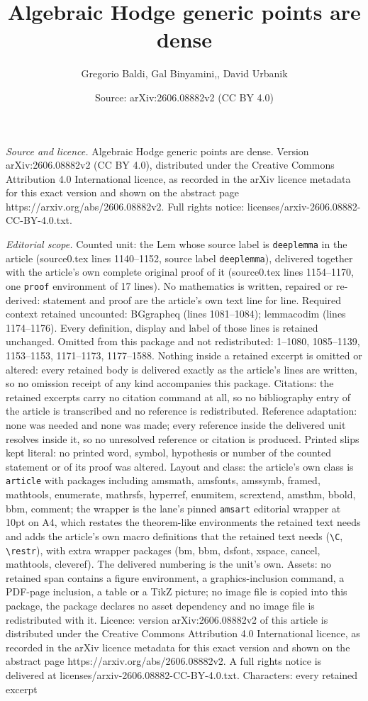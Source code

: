 \documentclass[10pt,a4paper]{amsart}
\title[Algebraic Hodge generic points are dense]{Algebraic Hodge generic points are dense}
\author{Gregorio Baldi, Gal Binyamini,, David Urbanik}
\date{Source: arXiv:2606.08882v2 (CC BY 4.0)}
\begin{document}
\maketitle

\noindent\emph{Source and licence.} Algebraic Hodge generic points are dense. Version arXiv:2606.08882v2 (CC BY 4.0), distributed under the Creative Commons Attribution 4.0 International licence, as recorded in the arXiv licence metadata for this exact version and shown on the abstract page https://arxiv.org/abs/2606.08882v2. Full rights notice: licenses/arxiv-2606.08882-CC-BY-4.0.txt.\par\smallskip

\noindent\textit{Editorial scope.} Counted unit: the Lem whose source label is \texttt{deeplemma} in the article (source0.tex lines 1140--1152, source label \texttt{deeplemma}), delivered together with the article's own complete original proof of it (source0.tex lines 1154--1170, one \texttt{proof} environment of 17 lines). No mathematics is written, repaired or re-derived: statement and proof are the article's own text line for line. Required context retained uncounted: BGgrapheq (lines 1081--1084); lemmacodim (lines 1174--1176). Every definition, display and label of those lines is retained unchanged. Omitted from this package and not redistributed: 1--1080, 1085--1139, 1153--1153, 1171--1173, 1177--1588. Nothing inside a retained excerpt is omitted or altered: every retained body is delivered exactly as the article's lines are written, so no omission receipt of any kind accompanies this package. Citations: the retained excerpts carry no citation command at all, so no bibliography entry of the article is transcribed and no reference is redistributed. Reference adaptation: none was needed and none was made; every reference inside the delivered unit resolves inside it, so no unresolved reference or citation is produced. Printed slips kept literal: no printed word, symbol, hypothesis or number of the counted statement or of its proof was altered. Layout and class: the article's own class is \texttt{article} with packages including amsmath, amsfonts, amssymb, framed, mathtools, enumerate, mathrsfs, hyperref, enumitem, scrextend, amsthm, bbold, bbm, comment; the wrapper is the lane's pinned \texttt{amsart} editorial wrapper at 10pt on A4, which restates the theorem-like environments the retained text needs and adds the article's own macro definitions that the retained text needs (\texttt{\textbackslash C}, \texttt{\textbackslash restr}), with extra wrapper packages (bm, bbm, dsfont, xspace, cancel, mathtools, cleveref). The delivered numbering is the unit's own. Assets: no retained span contains a figure environment, a graphics-inclusion command, a PDF-page inclusion, a table or a TikZ picture; no image file is copied into this package, the package declares no asset dependency and no image file is redistributed with it. Licence: version arXiv:2606.08882v2 of this article is distributed under the Creative Commons Attribution 4.0 International licence, as recorded in the arXiv licence metadata for this exact version and shown on the abstract page https://arxiv.org/abs/2606.08882v2. A full rights notice is delivered at licenses/arxiv-2606.08882-CC-BY-4.0.txt. Characters: every retained excerpt 
\end{document}
